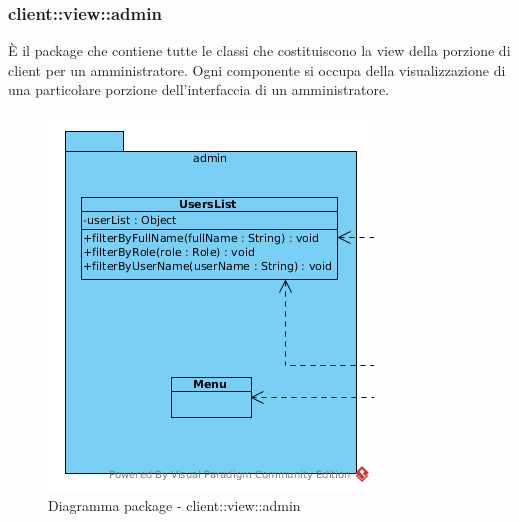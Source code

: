 \subsubsection{client::view::admin}
È il package che contiene tutte le classi che costituiscono la view della porzione di client per un amministratore. Ogni componente si occupa della visualizzazione di una particolare porzione dell'interfaccia di un amministratore.\begin{center}
		\begin{figure}[H]
			\centering \includegraphics[scale=4, max width=\textwidth, max height=\myheight]{../img/diagrammiClassi/client/view/admin.png}
			\caption{Diagramma package - client::view::admin}
		\end{figure}
	\end{center}\hypertarget{client::view::admin::UsersList}{}

